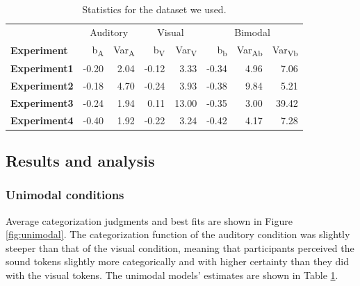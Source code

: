 \documentclass[english,,man,floatsintext]{apa6}
\theoremstyle{definition}
\theoremstyle{definition}
\theoremstyle{definition}
\theoremstyle{remark}
\begin{document}
\begin{table}

\caption{\label{tab:param}Statistics for the dataset we used.}
\centering
\begin{tabular}[t]{>{\bfseries}lrrrrrrr}
\toprule
\multicolumn{1}{c}{} & \multicolumn{2}{c}{Auditory} & \multicolumn{2}{c}{Visual} & \multicolumn{3}{c}{Bimodal} \\
\cmidrule(l{2pt}r{2pt}){2-3} \cmidrule(l{2pt}r{2pt}){4-5} \cmidrule(l{2pt}r{2pt}){6-8}
Experiment & b\textsubscript{A} & Var\textsubscript{A} & b\textsubscript{V} & Var\textsubscript{V} & b\textsubscript{b} & Var\textsubscript{Ab} & Var\textsubscript{Vb}\\
\midrule
Experiment1 & -0.20 & 2.04 & -0.12 & 3.33 & -0.34 & 4.96 & 7.06\\
Experiment2 & -0.18 & 4.70 & -0.24 & 3.93 & -0.38 & 9.84 & 5.21\\
Experiment3 & -0.24 & 1.94 & 0.11 & 13.00 & -0.35 & 3.00 & 39.42\\
Experiment4 & -0.40 & 1.92 & -0.22 & 3.24 & -0.42 & 4.17 & 7.28\\
\bottomrule
\end{tabular}
\end{table}

\subsection{Results and analysis}\label{results-and-analysis}

\subsubsection{Unimodal conditions}\label{unimodal-conditions-1}

Average categorization judgments and best fits are shown in Figure
\ref{fig:unimodal}. The categorization function of the auditory
condition was slightly steeper than that of the visual condition,
meaning that participants perceived the sound tokens slightly more
categorically and with higher certainty than they did with the visual
tokens. The unimodal models' estimates are shown in Table
\ref{tab:param}.
\end{document}

